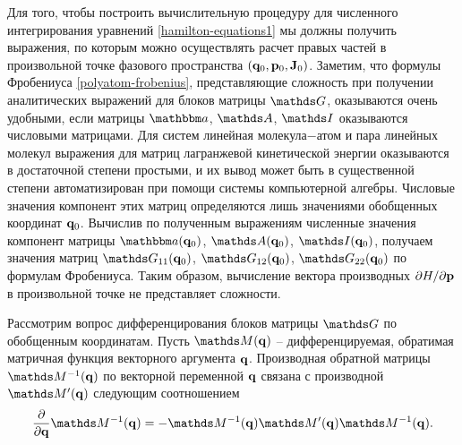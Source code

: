 Для того, чтобы построить вычислительную процедуру для численного интегрирования уравнений \eqref{hamilton-equations1} мы должны получить выражения, по которым можно осуществлять расчет правых частей в произвольной точке фазового пространства $\left( \mathbf{q}_0, \mathbf{p}_0, \mathbf{J}_0 \right)$. Заметим, что формулы Фробениуса \eqref{polyatom-frobenius}, представляющие сложность при получении аналитических выражений для блоков матрицы $\bbG$, оказываются очень удобными, если матрицы $\bba$, $\bbA$, $\bbI$ оказываются числовыми матрицами. Для систем линейная молекула$-$атом и пара линейных молекул выражения для матриц лагранжевой кинетической энергии оказываются в достаточной степени простыми, и их вывод может быть в существенной степени автоматизирован при помощи системы компьютерной алгебры. Числовые значения компонент этих матриц определяются лишь значениями обобщенных координат $\mathbf{q}_0$. Вычислив по полученным выражениям численные значения компонент матрицы $\bba(\mf{q}_0)$, $\bbA(\mf{q}_0)$, $\bbI(\mf{q}_0)$, получаем значения матриц $\bbG_{11}(\mf{q}_0)$, $\bbG_{12}(\mf{q}_0)$, $\bbG_{22}(\mf{q}_0)$ по формулам Фробениуса. Таким образом, вычисление вектора производных $\partial H / \partial \mathbf{p}$ в произвольной точке не представляет сложности. \par
Рассмотрим вопрос дифференцирования блоков матрицы $\bbG$ по обобщенным координатам. Пусть $\bbM(\mf{q})$ -- дифференцируемая, обратимая матричная функция векторного аргумента $\mathbf{q}$. Производная обратной матрицы $\bbM^{-1}(\mf{q})$ по векторной переменной $\mathbf{q}$ связана с производной $\bbM^\prime(\mf{q})$ следующим соотношением \cite{matrixcookbook}
\begin{gather}
    \frac{\partial}{\partial \mf{q}} \bbM^{-1}(\mf{q}) = - \bbM^{-1}(\mf{q}) \bbM^\prime(\mf{q}) \bbM^{-1}(\mf{q}).
\end{gather}

